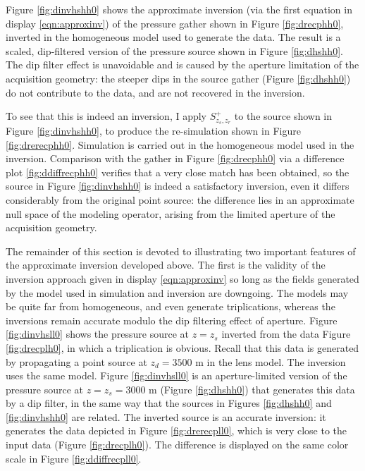 Figure \ref{fig:dinvhshh0} shows the approximate inversion (via the
first equation in display \ref{eqn:approxinv}) of the
pressure gather shown in Figure \ref{fig:drecphh0}, inverted in the homogeneous model
used to generate the data. The result is a scaled, dip-filtered
version of the pressure source shown in Figure \ref{fig:dhshh0}.
The dip filter effect is unavoidable and is caused by the aperture
limitation of the acquisition geometry: the steeper dips in the source
gather (Figure \ref{fig:dhshh0}) do not contribute to the data, and are not
recovered in the inversion.

To see that this is indeed an inversion, I apply $S^{+}_{z_s,z_r}$ to
the source shown in Figure \ref{fig:dinvhshh0}, to produce the
re-simulation shown in Figure \ref{fig:drerecphh0}. Simulation is carried
out in the homogeneous model used in the inversion. Comparison with the
gather in Figure \ref{fig:drecphh0} via a difference plot
\ref{fig:ddiffrecphh0} verifies that a very close match has been
obtained, so the source in Figure \ref{fig:dinvhshh0} is indeed a
satisfactory inversion, even it differs considerably from the original
point source: the difference lies in an approximate null space of the modeling
operator, arising from the limited aperture of the acquisition
geometry.

The remainder of this section is devoted to illustrating two important
features of the approximate inversion developed above. The
first is the validity of the inversion approach given in display
\ref{eqn:approxinv} so long as the fields generated by the
model used in simulation and inversion are downgoing. The models
may be quite far from homogeneous, and even generate triplications,
whereas the inversions remain accurate modulo the dip filtering effect
of aperture. Figure \ref{fig:dinvhsll0} shows the pressure source at $z=z_s$
inverted from the data Figure
\ref{fig:drecplh0}, in which a triplication is obvious. Recall that
this data is generated by propagating a point source at $z_d=3500$ m
in the lens model. The inversion uses the same model. Figure
\ref{fig:dinvhsll0} is an aperture-limited version of the pressure
source at $z=z_s=3000$ m
(Figure \ref{fig:dhshh0}) that generates this data by a dip filter, in
the same way that the sources in Figures \ref{fig:dhshh0} and
\ref{fig:dinvhshh0} are related. The inverted source is an accurate
inversion: it generates the data depicted in Figure
\ref{fig:drerecpll0}, which is very close to the input data (Figure
\ref{fig:drecplh0}). The difference is displayed on the same color
scale in Figure \ref{fig:ddiffrecpll0}.

